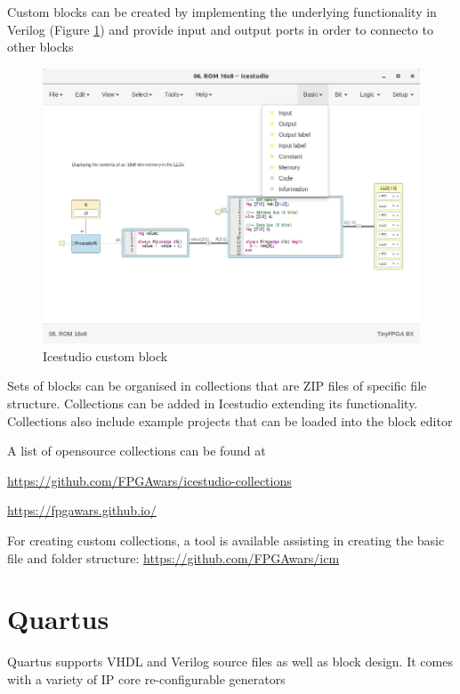 Custom blocks can be created by implementing the underlying functionality in Verilog (Figure \ref{ref:icestudio_custom_block}) and provide input and output ports in order to connecto to other blocks
\begin{figure}[ht]
\includegraphics[width=1\textwidth]{Images/icestudio_custom_block.png}
\caption{Icestudio custom block}
\label{ref:icestudio_custom_block}
\end{figure}

Sets of blocks can be organised in collections that are ZIP files of specific file structure. Collections can be added in Icestudio extending its functionality. Collections also include example projects that can be loaded into the block editor

A list of opensource collections can be found at 

\url{https://github.com/FPGAwars/icestudio-collections}

\url{https://fpgawars.github.io/}

For creating custom collections, a tool is available assisting in creating the basic file and folder structure: \url{https://github.com/FPGAwars/icm}

\section{Quartus}
Quartus supports VHDL and Verilog source files as well as block design. It comes with a variety of IP core re-configurable generators

